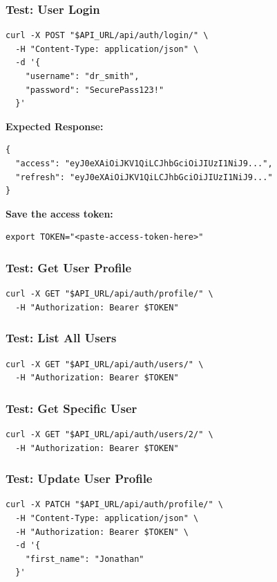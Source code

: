\documentclass[12pt,a4paper]{article}
\begin{document}
\subsubsection{Test: User Login}
\begin{lstlisting}[style=bash]
curl -X POST "$API_URL/api/auth/login/" \
  -H "Content-Type: application/json" \
  -d '{
    "username": "dr_smith",
    "password": "SecurePass123!"
  }'
\end{lstlisting}

\textbf{Expected Response:}
\begin{lstlisting}[style=json]
{
  "access": "eyJ0eXAiOiJKV1QiLCJhbGciOiJIUzI1NiJ9...",
  "refresh": "eyJ0eXAiOiJKV1QiLCJhbGciOiJIUzI1NiJ9..."
}
\end{lstlisting}

\textbf{Save the access token:}
\begin{lstlisting}[style=bash]
export TOKEN="<paste-access-token-here>"
\end{lstlisting}

\subsubsection{Test: Get User Profile}
\begin{lstlisting}[style=bash]
curl -X GET "$API_URL/api/auth/profile/" \
  -H "Authorization: Bearer $TOKEN"
\end{lstlisting}

\subsubsection{Test: List All Users}
\begin{lstlisting}[style=bash]
curl -X GET "$API_URL/api/auth/users/" \
  -H "Authorization: Bearer $TOKEN"
\end{lstlisting}

\subsubsection{Test: Get Specific User}
\begin{lstlisting}[style=bash]
curl -X GET "$API_URL/api/auth/users/2/" \
  -H "Authorization: Bearer $TOKEN"
\end{lstlisting}

\subsubsection{Test: Update User Profile}
\begin{lstlisting}[style=bash]
curl -X PATCH "$API_URL/api/auth/profile/" \
  -H "Content-Type: application/json" \
  -H "Authorization: Bearer $TOKEN" \
  -d '{
    "first_name": "Jonathan"
  }'
\end{lstlisting}
\end{document}
